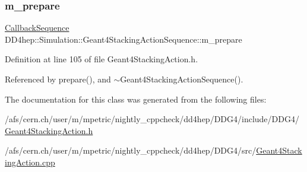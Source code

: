 \hypertarget{class_d_d4hep_1_1_simulation_1_1_geant4_stacking_action_sequence_a5e1405fee094690bb84d74c38b619bbc}{}\label{class_d_d4hep_1_1_simulation_1_1_geant4_stacking_action_sequence_a5e1405fee094690bb84d74c38b619bbc} 
\subsubsection{\texorpdfstring{m\+\_\+prepare}{m\_prepare}}
{\footnotesize\ttfamily \hyperlink{struct_d_d4hep_1_1_callback_sequence}{Callback\+Sequence} D\+D4hep\+::\+Simulation\+::\+Geant4\+Stacking\+Action\+Sequence\+::m\+\_\+prepare\hspace{0.3cm}{\ttfamily [protected]}}



Definition at line 105 of file Geant4\+Stacking\+Action.\+h.



Referenced by prepare(), and $\sim$\+Geant4\+Stacking\+Action\+Sequence().



The documentation for this class was generated from the following files\+:\begin{DoxyCompactItemize}
\item 
/afs/cern.\+ch/user/m/mpetric/nightly\+\_\+cppcheck/dd4hep/\+D\+D\+G4/include/\+D\+D\+G4/\hyperlink{_geant4_stacking_action_8h}{Geant4\+Stacking\+Action.\+h}\item 
/afs/cern.\+ch/user/m/mpetric/nightly\+\_\+cppcheck/dd4hep/\+D\+D\+G4/src/\hyperlink{_geant4_stacking_action_8cpp}{Geant4\+Stacking\+Action.\+cpp}\end{DoxyCompactItemize}

